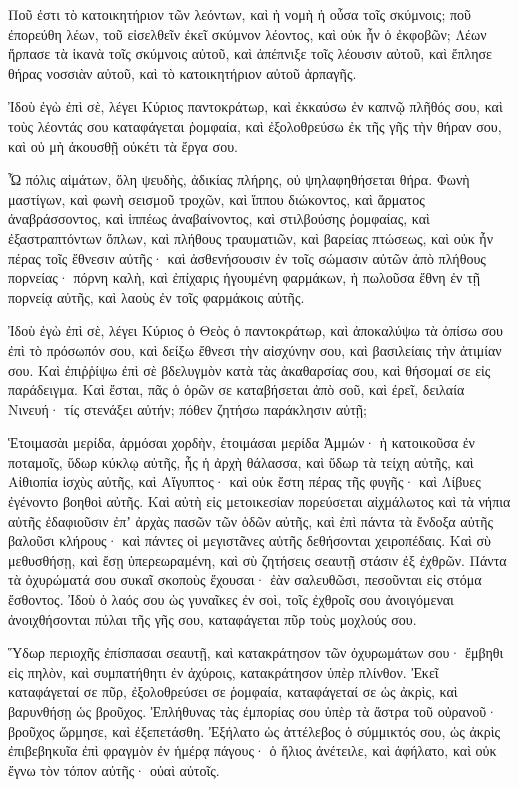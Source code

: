 \begin{spacing}{1.1}
\begin{multicols}{2}
Ποῦ ἐστι τὸ κατοικητήριον τῶν λεόντων, καὶ ἡ νομὴ ἡ οὖσα τοῖς σκύμνοις; ποῦ ἐπορεύθη λέων, τοῦ εἰσελθεῖν ἐκεῖ σκύμνον λέοντος, καὶ οὐκ ἦν ὁ ἐκφοβῶν;
Λέων ἥρπασε τὰ ἱκανὰ τοῖς σκύμνοις αὐτοῦ, καὶ ἀπέπνιξε τοῖς λέουσιν αὐτοῦ, καὶ ἔπλησε θήρας νοσσιὰν αὐτοῦ, καὶ τὸ κατοικητήριον αὐτοῦ ἁρπαγῆς.

Ἰδοὺ ἐγὼ ἐπὶ σὲ, λέγει Κύριος παντοκράτωρ, καὶ ἐκκαύσω ἐν καπνῷ πλῆθός σου, καὶ τοὺς λέοντάς σου καταφάγεται ῥομφαία, καὶ ἐξολοθρεύσω ἐκ τῆς γῆς τὴν θήραν σου, καὶ οὐ μὴ ἀκουσθῇ οὐκέτι τὰ ἔργα σου.

Ὦ πόλις αἱμάτων, ὅλη ψευδὴς, ἀδικίας πλήρης, οὐ ψηλαφηθήσεται θήρα.
Φωνὴ μαστίγων, καὶ φωνὴ σεισμοῦ τροχῶν, καὶ ἵππου διώκοντος, καὶ ἅρματος ἀναβράσσοντος,
καὶ ἱππέως ἀναβαίνοντος, καὶ στιλβούσης ῥομφαίας, καὶ ἐξαστραπτόντων ὅπλων, καὶ πλήθους τραυματιῶν, καὶ βαρείας πτώσεως, καὶ οὐκ ἦν πέρας τοῖς ἔθνεσιν αὐτῆς· καὶ ἀσθενήσουσιν ἐν τοῖς σώμασιν αὐτῶν ἀπὸ πλήθους πορνείας·
πόρνη καλὴ, καὶ ἐπίχαρις ἡγουμένη φαρμάκων, ἡ πωλοῦσα ἔθνη ἐν τῇ πορνείᾳ αὐτῆς, καὶ λαοὺς ἐν τοῖς φαρμάκοις αὐτῆς.

Ἰδοὺ ἐγὼ ἐπὶ σὲ, λέγει Κύριος ὁ Θεὸς ὁ παντοκράτωρ, καὶ ἀποκαλύψω τὰ ὀπίσω σου ἐπὶ τὸ πρόσωπόν σου, καὶ δείξω ἔθνεσι τὴν αἰσχύνην σου, καὶ βασιλείαις τὴν ἀτιμίαν σου.
Καὶ ἐπιῤῥίψω ἐπὶ σὲ βδελυγμὸν κατὰ τὰς ἀκαθαρσίας σου, καὶ θήσομαί σε εἰς παράδειγμα.
Καὶ ἔσται, πᾶς ὁ ὁρῶν σε καταβήσεται ἀπὸ σοῦ, καὶ ἐρεῖ, δειλαία Νινευή· τίς στενάξει αὐτήν; πόθεν ζητήσω παράκλησιν αὐτῇ;

Ἑτοιμασὰι μερίδα, ἁρμόσαι χορδὴν, ἑτοιμάσαι μερίδα Ἀμμών· ἡ κατοικοῦσα ἐν ποταμοῖς, ὕδωρ κύκλῳ αὐτῆς, ἧς ἡ ἀρχὴ θάλασσα, καὶ ὕδωρ τὰ τείχη αὐτῆς,
καὶ Αἰθιοπία ἰσχὺς αὐτῆς, καὶ Αἴγυπτος· καὶ οὐκ ἔστη πέρας τῆς φυγῆς· καὶ Λίβυες ἐγένοντο βοηθοὶ αὐτῆς.
Καὶ αὐτὴ εἰς μετοικεσίαν πορεύσεται αἰχμάλωτος καὶ τὰ νήπια αὐτῆς ἐδαφιοῦσιν ἐπʼ ἀρχὰς πασῶν τῶν ὁδῶν αὐτῆς, καὶ ἐπὶ πάντα τὰ ἔνδοξα αὐτῆς βαλοῦσι κλήρους· καὶ πάντες οἱ μεγιστᾶνες αὐτῆς δεθήσονται χειροπέδαις.
Καὶ σὺ μεθυσθήσῃ, καὶ ἔσῃ ὑπερεωραμένη, καὶ σὺ ζητήσεις σεαυτῇ στάσιν ἐξ ἐχθρῶν.
Πάντα τὰ ὀχυρώματά σου συκαῖ σκοποὺς ἔχουσαι· ἐὰν σαλευθῶσι, πεσοῦνται εἰς στόμα ἔσθοντος.
Ἰδοὺ ὁ λαός σου ὡς γυναῖκες ἐν σοὶ, τοῖς ἐχθροῖς σου ἀνοιγόμεναι ἀνοιχθήσονται πύλαι τῆς γῆς σου, καταφάγεται πῦρ τοὺς μοχλούς σου.

Ὕδωρ περιοχῆς ἐπίσπασαι σεαυτῇ, καὶ κατακράτησον τῶν ὀχυρωμάτων σου· ἔμβηθι εἰς πηλὸν, καὶ συμπατήθητι ἐν ἀχύροις, κατακράτησον ὑπὲρ πλίνθον.
Ἐκεῖ καταφάγεταί σε πῦρ, ἐξολοθρεύσει σε ῥομφαία, καταφάγεταί σε ὡς ἀκρὶς, καὶ βαρυνθήσῃ ὡς βροῦχος.
Ἐπλήθυνας τὰς ἐμπορίας σου ὑπὲρ τὰ ἄστρα τοῦ οὐρανοῦ· βροῦχος ὥρμησε, καὶ ἐξεπετάσθη.
Ἐξήλατο ὡς ἀττέλεβος ὁ σύμμικτός σου, ὡς ἀκρὶς ἐπιβεβηκυῖα ἐπὶ φραγμὸν ἐν ἡμέρᾳ πάγους· ὁ ἥλιος ἀνέτειλε, καὶ ἀφήλατο, καὶ οὐκ ἔγνω τὸν τόπον αὐτῆς· οὐαὶ αὐτοῖς.


\end{multicols}
\end{spacing}
